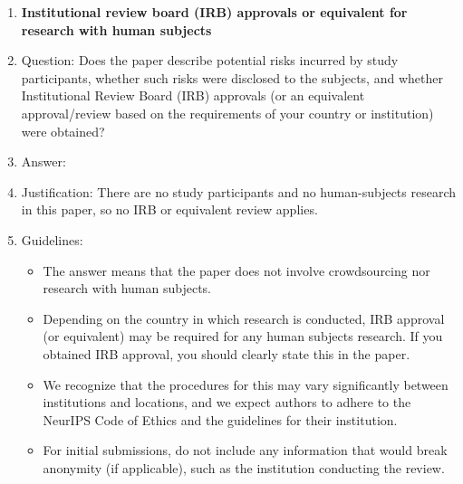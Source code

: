 \begin{enumerate}
\item {\bf Institutional review board (IRB) approvals or equivalent for research with human subjects}
    \item[] Question: Does the paper describe potential risks incurred by study participants, whether such risks were disclosed to the subjects, and whether Institutional Review Board (IRB) approvals (or an equivalent approval/review based on the requirements of your country or institution) were obtained?
    \item[] Answer: \answerNA{}
    \item[] Justification: There are no study participants and no human-subjects research in this paper, so no IRB or equivalent review applies.
    \item[] Guidelines:
    \begin{itemize}
        \item The answer \answerNA{} means that the paper does not involve crowdsourcing nor research with human subjects.
        \item Depending on the country in which research is conducted, IRB approval (or equivalent) may be required for any human subjects research. If you obtained IRB approval, you should clearly state this in the paper.
        \item We recognize that the procedures for this may vary significantly between institutions and locations, and we expect authors to adhere to the NeurIPS Code of Ethics and the guidelines for their institution.
        \item For initial submissions, do not include any information that would break anonymity (if applicable), such as the institution conducting the review.
    \end{itemize}


\end{enumerate}

